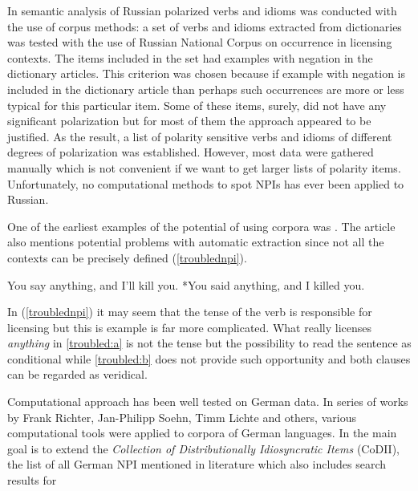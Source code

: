 \documentclass[a4paper,12pt]{article}
\begin{document}
    In \parencite{apresyannpi} semantic analysis of Russian polarized verbs and idioms was conducted with the use of corpus methods: a set of verbs and idioms extracted from dictionaries was tested with the use of Russian National Corpus on occurrence in licensing contexts. The items included in the set had examples with negation in the dictionary articles. This criterion was chosen because if example with negation is included in the dictionary article than perhaps such occurrences are more or less typical for this particular item. Some of these items, surely, did not have any significant polarization but for most of them the approach appeared to be justified. As the result, a list of polarity sensitive verbs and idioms of different degrees of polarization was established. However, most data were gathered manually which is not convenient if we want to get larger lists of polarity items. Unfortunately, no computational methods to spot NPIs has ever been applied to Russian.
    \par
    One of the earliest examples of the potential of using corpora was \parencite{hoeksema1997}.
    The article also mentions potential problems with automatic extraction since not all the contexts can be precisely defined (\ref{troublednpi}).

	\begin{exe}
		\ex \label{troublednpi}
		\begin{xlist}
			\ex \label{troubled:a}
			You say anything, and I'll kill you.
			\ex \label{troubled:b}
			*You said anything, and I killed you.
		\end{xlist} 
	\end{exe}
    
    In (\ref{troublednpi}) it may seem that the tense of the verb is responsible for licensing but this is example is far more complicated. What really licenses \textit{anything} in \ref{troubled:a} is not the tense but the possibility to read the sentence as conditional while \ref{troubled:b} does not provide such opportunity and both clauses can be regarded as veridical.
    \par
    Computational approach has been well tested on German data. In series of works by Frank Richter, Jan-Philipp Soehn, Timm Lichte and others, various computational tools were applied to corpora of German languages. In \parencite{multiwordnpiger} the main goal is to extend the \textit{Collection of Distributionally Idiosyncratic Items} (CoDII), the list of all German NPI mentioned in literature which also includes search results for \parencite{lichte2005}
	
\end{document}
